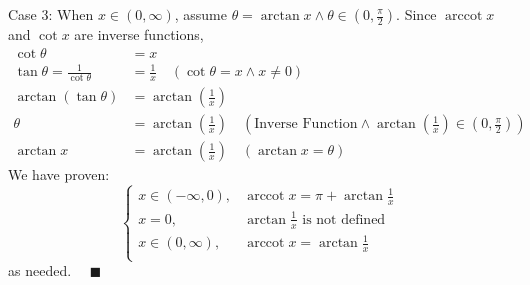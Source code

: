 \documentclass[12pt]{exam}
\DeclareMathOperator{\arccot}{arccot}
\begin{document}
\begin{enumerate}
\begin{enumerate}
	Case 3: When $x\in(0, \infty)$, assume $\theta=\arctan x \land \theta \in(0, \frac{\pi}{2}).$ Since $\arccot x$ and $\cot x$ are inverse functions,
	\begin{align*}
	    \cot\theta&=x\\
	    \tan\theta=\frac{1}{\cot\theta}&=\frac{1}{x}\quad(\cot\theta=x\land x\neq0)\\
	    \arctan(\tan\theta)&=\arctan(\frac{1}{x})\\
	    \theta&=\arctan(\frac{1}{x})\quad(\mbox{Inverse Function} \land \arctan(\frac{1}{x})\in (0, \frac{\pi}{2}))\\
	    \arctan x&=\arctan(\frac{1}{x})\quad(\arctan x=\theta)
	\end{align*}
	We have proven:
	$$
	\begin{cases}
	    x\in(-\infty, 0),&\arccot x=\pi+\arctan\frac{1}{x}\\
	    x=0,&\arctan\frac{1}{x} \mbox{ is not defined}\\
	    x\in(0, \infty),&\arccot x=\arctan\frac{1}{x}\\
	\end{cases}
	$$
	\qquad as needed. $\quad\blacksquare$

	\end{enumerate}


\end{enumerate}
\end{document}
